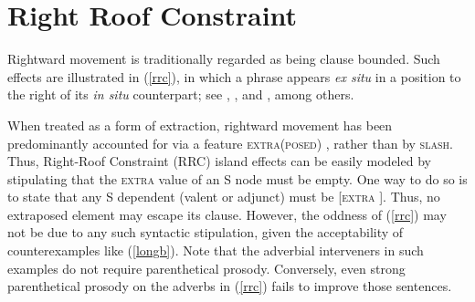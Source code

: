 \documentclass[output=paper
 	        ,biblatex
                ,babelshorthands
                ,newtxmath
                ,draftmode
                ,colorlinks, citecolor=brown
]{langscibook}
\begin{document}



\zl



\section{Right Roof Constraint}

Rightward movement is traditionally regarded as being clause bounded. Such \emph{} \citep[Section~5.1.2]{Ross67} effects are illustrated in (\ref{rrc}), in which a
phrase appears \emph{ex situ} in a position to the right of its \emph{in situ} counterpart; see
\citet{akma75}, \citet{baltin78}, and \citet{stowelldiss}, among others.

\eal \label{rrc}
\ex[*]{It was believed \trace$_i$ that [there walked into the room \trace$_j$ ]  [by everyone]$_i$ [a man with  long blond hair]$_j$].\footnote{
\citew[\page 386]{rochemont}}}
\zl



\noindent
When treated as a form of extraction, rightward movement has been predominantly accounted for via a
feature \textsc{extra(posed)} \parencites{kellerverb,Keller95b,Bouma96,eynde96}[Section~13.2]{Mueller99a}{KimSag2005},
rather than by \textsc{slash}.  Thus, Right-Roof Constraint (RRC) island effects can be easily modeled
by stipulating that the \textsc{extra} value of an S node must be empty. One way to do so is to state
that any S dependent (valent or adjunct) must be [\textsc{extra} \eliste].  Thus, no extraposed element
may escape its clause. However, the oddness of (\ref{rrc}) may not be due to any such syntactic
stipulation, given the acceptability of counterexamples like (\ref{longb}). Note that the adverbial
interveners in such examples do not require parenthetical prosody. Conversely, even strong
parenthetical prosody on the adverbs in (\ref{rrc}) fails to improve those sentences.
\end{document}
